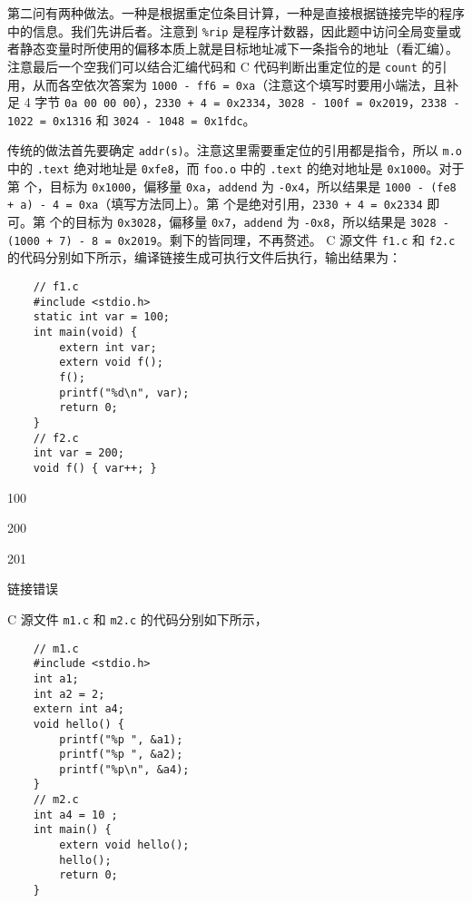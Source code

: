 \begin{problems}
        第二问有两种做法。一种是根据重定位条目计算，一种是直接根据链接完毕的程序中的信息。我们先讲后者。注意到 \verb|%rip| 是程序计数器，因此题中访问全局变量或者静态变量时所使用的偏移本质上就是目标地址减下一条指令的地址（看汇编）。注意最后一个空我们可以结合汇编代码和 C 代码判断出重定位的是 \verb|count| 的引用，从而各空依次答案为 \verb|1000 - ff6 = 0xa|（注意这个填写时要用小端法，且补足 4 字节 \verb|0a 00 00 00|），\verb|2330 + 4 = 0x2334|，\verb|3028 - 100f = 0x2019|，\verb|2338 - 1022 = 0x1316| 和 \verb|3024 - 1048 = 0x1fdc|。

        传统的做法首先要确定 \verb|addr(s)|。注意这里需要重定位的引用都是指令，所以 \verb|m.o| 中的 \verb|.text| 绝对地址是 \verb|0xfe8|，而 \verb|foo.o| 中的 \verb|.text| 的绝对地址是 \verb|0x1000|。对于第  个，目标为 \verb|0x1000|，偏移量 \verb|0xa|，\verb|addend| 为 \verb|-0x4|，所以结果是 \verb|1000 - (fe8 + a) - 4 = 0xa|（填写方法同上）。第  个是绝对引用，\verb|2330 + 4 = 0x2334| 即可。第  个的目标为 \verb|0x3028|，偏移量 \verb|0x7|，\verb|addend| 为 \verb|-0x8|，所以结果是 \verb|3028 - (1000 + 7) - 8 = 0x2019|。剩下的皆同理，不再赘述。
         C 源文件 \verb|f1.c| 和 \verb|f2.c| 的代码分别如下所示，编译链接生成可执行文件后执行，输出结果为：
        \begin{verbatim}
    // f1.c
    #include <stdio.h>
    static int var = 100;
    int main(void) {
        extern int var;
        extern void f();
        f();
        printf("%d\n", var);
        return 0;
    }
    // f2.c
    int var = 200;
    void f() { var++; }
        \end{verbatim}
        \begin{choices}
            \item 100
            \item 200
            \item 201
            \item 链接错误
        \end{choices}
         C 源文件 \verb|m1.c| 和 \verb|m2.c| 的代码分别如下所示，
        \begin{verbatim}
    // m1.c
    #include <stdio.h>
    int a1;
    int a2 = 2;
    extern int a4;
    void hello() {
        printf("%p ", &a1);
        printf("%p ", &a2);
        printf("%p\n", &a4);
    }
    // m2.c
    int a4 = 10 ;
    int main() {
        extern void hello();
        hello();
        return 0; 
    }
        \end{verbatim}

\end{problems}
